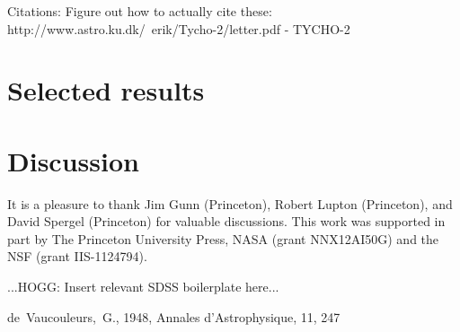 \documentclass[12pt,preprint,pdftex]{aastex}
\begin{document}
Citations: Figure out how to actually cite these:
http://www.astro.ku.dk/~erik/Tycho-2/letter.pdf  - TYCHO-2

\section{Selected results}

\section{Discussion}

\acknowledgements It is a pleasure to thank
  Jim Gunn (Princeton),
  Robert Lupton (Princeton), and
  David Spergel (Princeton)
for valuable discussions.
This work was supported in part by The Princeton University Press,
NASA (grant NNX12AI50G) and the NSF (grant IIS-1124794).

...HOGG: Insert relevant SDSS boilerplate here...

\begin{thebibliography}{70}
de~Vaucouleurs,~G., 1948, Annales d'Astrophysique, 11, 247
\end{thebibliography}
\end{document}

